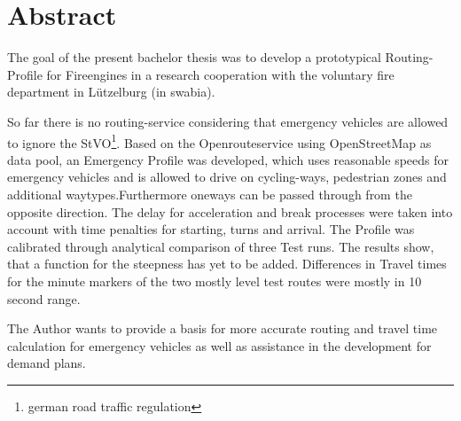 {\centering\section*{Abstract}}

\vspace{1cm}


The goal of the present bachelor thesis was to develop a prototypical Routing-Profile for Fireengines in a research cooperation with the voluntary fire department in Lützelburg (in swabia).
\medskip

So far there is no routing-service considering that emergency vehicles are allowed to ignore the StVO\footnote{german road traffic regulation}.
Based on the Openrouteservice using OpenStreetMap as data pool, an Emergency Profile was developed, which uses reasonable speeds for emergency vehicles and is allowed to drive on cycling-ways, pedestrian zones and additional waytypes.Furthermore oneways can be passed through from the opposite direction.
The delay for acceleration and break processes were taken into account with time penalties for starting, turns and arrival.
The Profile was calibrated through analytical comparison of three Test runs.
The results show, that a function for the steepness has yet to be added.
Differences in Travel times for the minute markers of the two mostly level test routes were mostly in 10 second range.
\bigskip

The Author wants to provide a basis for more accurate routing and travel time calculation for emergency vehicles as well as assistance in the development for demand plans.

